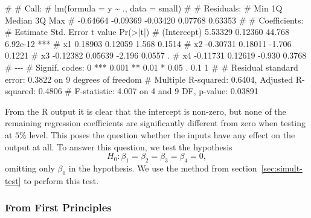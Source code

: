 \documentclass[
  a4paper,
]{article}
\newenvironment{Shaded}{\begin{snugshade}}{\end{snugshade}}
\newcommand{\NormalTok}[1]{#1}
\theoremstyle{definition}
\theoremstyle{definition}
\theoremstyle{definition}
\theoremstyle{definition}
\theoremstyle{remark}
\begin{document}
\begin{Shaded}
\begin{Highlighting}[]
\NormalTok{\# }
\NormalTok{\# Call:}
\NormalTok{\# lm(formula = y \textasciitilde{} ., data = small)}
\NormalTok{\# }
\NormalTok{\# Residuals:}
\NormalTok{\#      Min       1Q   Median       3Q      Max }
\NormalTok{\# {-}0.64664 {-}0.09369 {-}0.03420  0.07768  0.63353 }
\NormalTok{\# }
\NormalTok{\# Coefficients:}
\NormalTok{\#             Estimate Std. Error t value Pr(\textgreater{}|t|)    }
\NormalTok{\# (Intercept)  5.53329    0.12360  44.768 6.92e{-}12 ***}
\NormalTok{\# x1           0.18903    0.12059   1.568   0.1514    }
\NormalTok{\# x2          {-}0.30731    0.18011  {-}1.706   0.1221    }
\NormalTok{\# x3          {-}0.12382    0.05639  {-}2.196   0.0557 .  }
\NormalTok{\# x4          {-}0.11731    0.12619  {-}0.930   0.3768    }
\NormalTok{\# {-}{-}{-}}
\NormalTok{\# Signif. codes:  0 \textquotesingle{}***\textquotesingle{} 0.001 \textquotesingle{}**\textquotesingle{} 0.01 \textquotesingle{}*\textquotesingle{} 0.05 \textquotesingle{}.\textquotesingle{} 0.1 \textquotesingle{} \textquotesingle{} 1}
\NormalTok{\# }
\NormalTok{\# Residual standard error: 0.3822 on 9 degrees of freedom}
\NormalTok{\# Multiple R{-}squared:  0.6404,  Adjusted R{-}squared:  0.4806 }
\NormalTok{\# F{-}statistic: 4.007 on 4 and 9 DF,  p{-}value: 0.03891}
\end{Highlighting}
\end{Shaded}

From the R output it is clear that the intercept is non-zero,
but none of the remaining regression coefficients are significantly
different from zero when testing at \(5\%\) level. This poses the question
whether the inputs have any effect on the output at all.
To answer this question, we test the hypothesis
\begin{equation*}
  H_0\colon \beta_1 = \beta_2 = \beta_3 = \beta_4 = 0,
\end{equation*}
omitting only \(\beta_0\) in the hypothesis. We use the method from
section~\ref{sec:simult-test} to perform this test.

\subsubsection{From First Principles}\label{from-first-principles-2}
\end{document}
